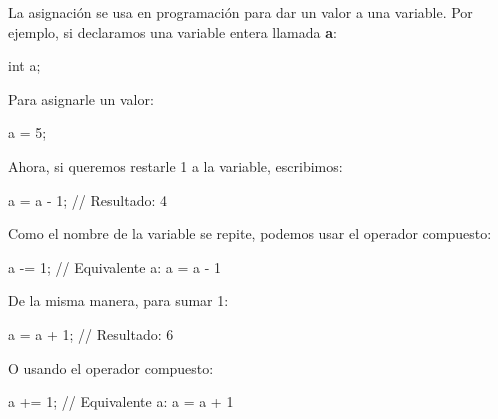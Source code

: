\documentclass[
  11pt,
  a4paper,
  DIV=11,
  numbers=noendperiod]{scrreprt}
\newenvironment{Shaded}{\begin{snugshade}}{\end{snugshade}}
\newcommand{\CommentTok}[1]{\textcolor[rgb]{0.37,0.37,0.37}{#1}}
\newcommand{\DataTypeTok}[1]{\textcolor[rgb]{0.68,0.00,0.00}{#1}}
\newcommand{\DecValTok}[1]{\textcolor[rgb]{0.68,0.00,0.00}{#1}}
\newcommand{\NormalTok}[1]{\textcolor[rgb]{0.00,0.23,0.31}{#1}}
\newcommand{\OperatorTok}[1]{\textcolor[rgb]{0.37,0.37,0.37}{#1}}
\begin{document}
La asignación se usa en programación para dar un valor a una variable.
Por ejemplo, si declaramos una variable entera llamada \textbf{a}:

\begin{Shaded}
\begin{Highlighting}[]
    \DataTypeTok{int}\NormalTok{ a}\OperatorTok{;}
\end{Highlighting}
\end{Shaded}

Para asignarle un valor:

\begin{Shaded}
\begin{Highlighting}[]
\NormalTok{    a }\OperatorTok{=} \DecValTok{5}\OperatorTok{;}
\end{Highlighting}
\end{Shaded}

Ahora, si queremos restarle 1 a la variable, escribimos:

\begin{Shaded}
\begin{Highlighting}[]
\NormalTok{    a }\OperatorTok{=}\NormalTok{ a }\OperatorTok{{-}} \DecValTok{1}\OperatorTok{;}  \CommentTok{// Resultado: 4}
\end{Highlighting}
\end{Shaded}

Como el nombre de la variable se repite, podemos usar el operador
compuesto:

\begin{Shaded}
\begin{Highlighting}[]
\NormalTok{    a }\OperatorTok{{-}=} \DecValTok{1}\OperatorTok{;}     \CommentTok{// Equivalente a: a = a {-} 1}
\end{Highlighting}
\end{Shaded}

De la misma manera, para sumar 1:

\begin{Shaded}
\begin{Highlighting}[]
\NormalTok{    a }\OperatorTok{=}\NormalTok{ a }\OperatorTok{+} \DecValTok{1}\OperatorTok{;}  \CommentTok{// Resultado: 6}
\end{Highlighting}
\end{Shaded}

O usando el operador compuesto:

\begin{Shaded}
\begin{Highlighting}[]
\NormalTok{    a }\OperatorTok{+=} \DecValTok{1}\OperatorTok{;}     \CommentTok{// Equivalente a: a = a + 1}
\end{Highlighting}
\end{Shaded}
\end{document}
